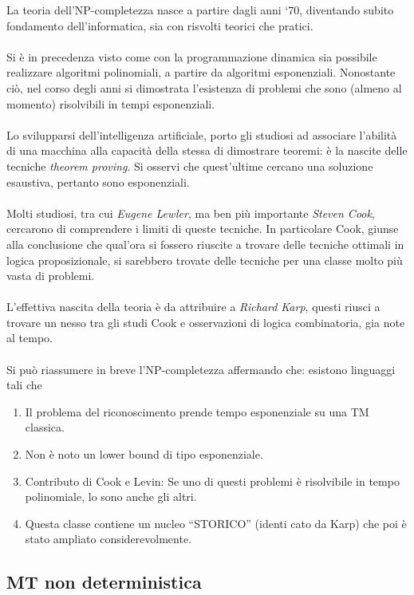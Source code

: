\documentclass{subfiles}
\begin{document}
La teoria dell'NP-completezza nasce a partire dagli anni `70, diventando subito fondamento dell'informatica, sia con risvolti teorici che pratici.
\\ \\
Si è in precedenza visto come con la programmazione dinamica sia possibile realizzare algoritmi polinomiali, a partire da algoritmi esponenziali.
Nonostante ciò, nel corso degli anni si dimostrata l'esistenza di problemi che sono (almeno al momento) risolvibili in tempi esponenziali.
\\ \\
Lo svilupparsi dell'intelligenza artificiale, porto gli studiosi ad associare l'abilità di una macchina alla capacità della stessa di dimostrare teoremi:
è la nascite delle tecniche \emph{theorem proving}. Si osservi che quest'ultime cercano una soluzione esaustiva, pertanto sono esponenziali.
\\ \\
Molti studiosi, tra cui \emph{Eugene Lewler}, ma ben più importante \emph{Steven Cook}, cercarono di comprendere i limiti di queste tecniche.
In particolare Cook, giunse alla conclusione che qual'ora si fossero riuscite a trovare delle tecniche ottimali in logica proposizionale,
si sarebbero trovate delle tecniche per una classe molto più vasta di problemi.
\\ \\
L'effettiva nascita della teoria è da attribuire a \emph{Richard Karp}, questi riusci a trovare un nesso tra gli studi Cook e osservazioni di logica combinatoria,
gia note al tempo.
\\ \\
Si può riassumere in breve l'NP-completezza affermando che: esistono linguaggi tali che
\begin{enumerate}
    \item Il problema del riconoscimento prende tempo esponenziale su una TM classica.
    \item Non è noto un lower bound di tipo esponenziale.
    \item Contributo di Cook e Levin: Se uno di questi problemi è risolvibile in tempo polinomiale, lo sono anche gli altri.
    \item Questa classe contiene un nucleo “STORICO” (identi cato da Karp) che poi è stato ampliato considerevolmente.
\end{enumerate}
\clearpage

\subsection{MT non deterministica}

\end{document}
